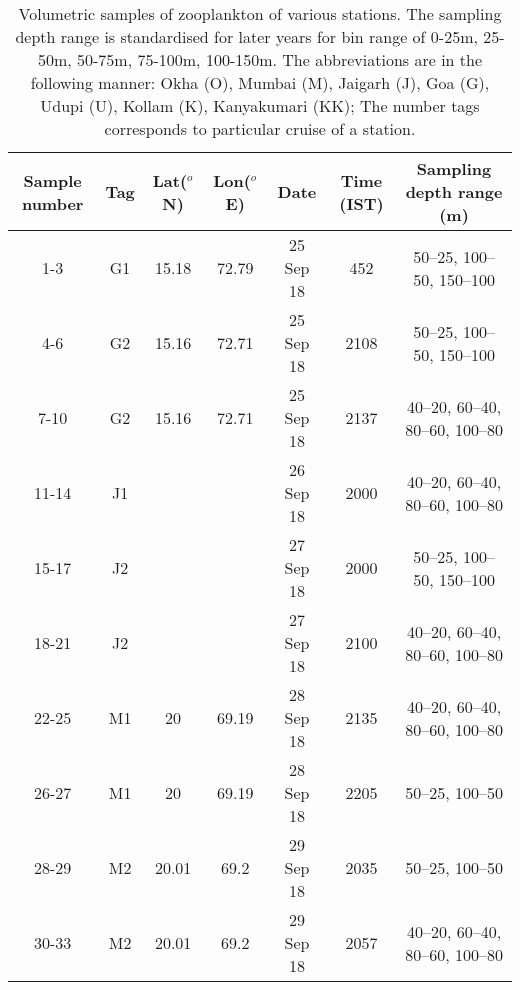 \documentclass{article}
\begin{document}
\begin{table}[htbp]
	
	{\footnotesize
		\captionsetup{justification=justified,font=footnotesize,skip=0.05\baselineskip,width=\textwidth} %
		\caption{\newline Volumetric samples of zooplankton of various stations. The sampling depth range is standardised for later years for bin range of 0-25m, 25-50m, 50-75m, 75-100m, 100-150m. The abbreviations are in the following manner: Okha (O), Mumbai (M), Jaigarh (J), Goa (G), Udupi (U), Kollam (K), Kanyakumari (KK); The number tags corresponds to particular cruise of a station.}
		\begin{adjustwidth}{0in}{0in} 
			\begin{tabular}{ccccccc}
				\toprule
				Sample number & Tag & Lat($^o$N)    & Lon($^o$E)   & Date & Time (IST) & Sampling depth range (m)      \\
				\midrule
				1-3         & G1  & 15.18      & 72.79      & 25 Sep 18                 & 452        & 50–25, 100–50, 150–100        \\
				4-6         & G2  & 15.16      & 72.71      & 25 Sep 18                 & 2108       & 50–25, 100–50, 150–100        \\
				7-10        & G2  & 15.16      & 72.71      & 25 Sep 18                 & 2137       & 40–20, 60–40, 80–60, 100–80   \\
				11-14       & J1  &            &            & 26 Sep 18                 & 2000       & 40–20, 60–40, 80–60, 100–80   \\
				15-17       & J2  &            &            & 27 Sep 18                 & 2000       & 50–25, 100–50, 150–100        \\
				18-21       & J2  &            &            & 27 Sep 18                 & 2100       & 40–20, 60–40, 80–60, 100–80   \\
				22-25       & M1  & 20         & 69.19      & 28 Sep 18                 & 2135       & 40–20, 60–40, 80–60, 100–80   \\
				26-27       & M1  & 20         & 69.19      & 28 Sep 18                 & 2205       & 50–25, 100–50                 \\
				28-29       & M2  & 20.01      & 69.2       & 29 Sep 18                 & 2035       & 50–25, 100–50                 \\
				30-33       & M2  & 20.01      & 69.2       & 29 Sep 18                 & 2057       & 40–20, 60–40, 80–60, 100–80   \\

\end{tabular}
\end{adjustwidth}}
\end{table}
\end{document}
